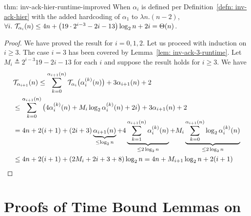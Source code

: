 \begin{usethmcounterof}{thm: inv-ack-hier-runtime-improved}
	When $\alpha_i$ is defined per Definition~\ref{defn: inv-ack-hier} with the added hardcoding of $\alpha_1$ to $\lambda n. (n - 2)$, $\forall i.~\mathcal{T}_{\alpha_i}(n) \le 4n + \left(19\cdot 2^{i-3} - 2i - 13\right)\log_2n + 2i = \Theta(n)$.
\end{usethmcounterof}

\begin{proof}
	We have proved the result for $i = 0, 1, 2$. Let us proceed with induction on $i\ge 3$. The case $i = 3$ has been covered by Lemma~\ref{lem: inv-ack-3-runtime}. Let $M_i \triangleq 2^{i-3}19 - 2i - 13$ for each $i$ and suppose the result holds for $i\ge 3$. We have
	\begin{equation*}
	\begin{aligned}
	& \mathcal{T}_{\alpha_{i+1}}(n) \le \sum_{k=0}^{\alpha_{i+1}(n)} \mathcal{T}_{\alpha_i}\big(\alpha_i^{(k)}(n)\big) + 3\alpha_{i+1}(n) + 2 \\
	& \le \sum_{k=0}^{\alpha_{i+1}(n)}\big(4\alpha_i^{(k)}(n) + M_i\log_2\alpha_i^{(k)}(n) + 2i \big) + 3\alpha_{i+1}(n) + 2 \\[-3pt]
  & = 4n + 2(i+1) + (2i + 3)\underbrace{\alpha_{i+1}(n)}_{\le \log_2n} + 4\underbrace{\sum_{k=1}^{\alpha_{i+1}(n)}\alpha_i^{(k)}(n)}_{\le 2\log_2n} + M_i\underbrace{\sum_{k=0}^{\alpha_{i+1}(n)}\log_2\alpha_i^{(k)}(n)}_{\le 2\log_2n} \\
	& \le 4n + 2(i+1) + (2M_i + 2i + 3 + 8)\log_2n
	= 4n + M_{i+1}\log_2n + 2(i+1)
  \end{aligned}
	\end{equation*}
\end{proof}

\section{Proofs of Time Bound Lemmas on }
\label{apx:time_analysis_bin}


